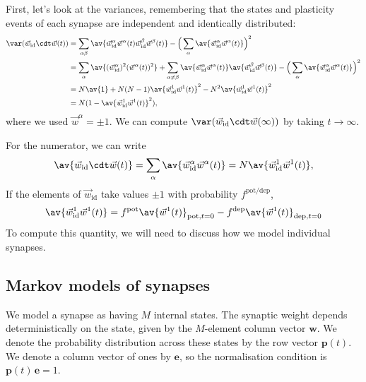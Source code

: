 \documentclass[12pt]{article}
\newcommand{\onev}{\mathbf{e}}
\newcommand{\prm}{p}
\newcommand{\pr}{\mathbf{\prm}}
\newcommand{\wm}{w}
\newcommand{\w}{\mathbf{\wm}}
\newcommand{\pot}{^{\text{pot}}}
\newcommand{\dep}{^{\text{dep}}}
\newcommand{\potdep}{^{\text{pot/dep}}}
\newcommand{\syn}{\vec{w}}
\newcommand{\synid}{\syn_\text{id}}
\begin{document}
First, let's look at the variances, remembering that the states and plasticity events of each synapse are independent and identically distributed:
%
\begin{equation}\label{eq:noise}
\begin{aligned}
  \var(\synid\cdt\syn(t))
    &= \sum_{\alpha\beta} \av{\synid^\alpha \syn^\alpha(t) \synid^\beta \syn^\beta(t)}
    - \Big(\sum_{\alpha} \av{\synid^\alpha \syn^\alpha(t)} \Big)^2 \\
    &= \sum_{\alpha} \av{(\synid^\alpha)^2(\syn^\alpha(t))^2}
    + \sum_{\alpha\neq\beta} \av{\synid^\alpha\syn^\alpha(t)}\av{\smash{\synid^\beta}\smash{\syn^\beta}(t)}
    - \Big(\sum_{\alpha} \av{\synid^\alpha \syn^\alpha(t)} \Big)^2  \\
    &= N\av{1}
    + N(N-1)\av{\synid^1 \syn^1(t)}^2
    - N^2\av{\synid^1 \syn^1(t)}^2 \\
    &= N(1-\av{\synid^1 \syn^1(t)}^2),
\end{aligned}
\end{equation}
%
where we used \(\syn^\alpha=\pm1\).
We can compute \(\var(\synid\cdt\syn(\infty))\) by taking \(t\to\infty\).

For the numerator, we can write
%
\begin{equation}\label{eq:overlapex}
  \av{\synid\cdt\syn(t)} = \sum_\alpha\av{\synid^\alpha\syn^\alpha(t)}
   = N \av{\synid^1\syn^1(t)},
\end{equation}
%
If the elements of \(\synid\) take values \(\pm1\) with probability \(f\potdep\),
%
\begin{equation}\label{eq:overlapone}
  \av{\synid^1\syn^1(t)} = f\pot \av{\syn^1(t)}_{\text{pot},t=0} - f\dep \av{\syn^1(t)}_{\text{dep},t=0}
\end{equation}
%
To compute this quantity, we will need to discuss how we model individual synapses.



\subsection{Markov models of synapses}\label{sec:markovsynapse}

We model a synapse as having \(M\) internal states.
The synaptic weight depends deterministically on the state, given by the \(M\)-element column vector \(\w\).
We denote the probability distribution across these states by the row vector \(\pr(t)\).
We denote a column vector of ones by \(\onev\), so the normalisation condition is \(\pr(t) \, \onev=1\).
\end{document}
